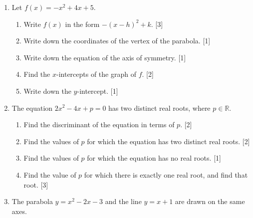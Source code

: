 \documentclass[12pt, twoside]{article}
\begin{document}
\begin{enumerate}[itemsep=0.2cm]
\newpage

\item Let $f(x) = -x^2 + 4x + 5$.

\begin{enumerate}[itemsep=0.15cm]
  \item Write $f(x)$ in the form $-(x - h)^2 + k$. \hfill [3]
  \item Write down the coordinates of the vertex of the parabola. \hfill [1]
  \item Write down the equation of the axis of symmetry. \hfill [1]
  \item Find the $x$-intercepts of the graph of $f$. \hfill [2]
  \item Write down the $y$-intercept. \hfill [1]
\end{enumerate}


\newpage

\item The equation $2x^2 - 4x + p = 0$ has two distinct real roots, where $p \in \mathbb{R}$.

\begin{enumerate}[itemsep=0.15cm]
  \item Find the discriminant of the equation in terms of $p$. \hfill [2]
  \item Find the values of $p$ for which the equation has two distinct real roots. \hfill [2]
  \item Find the values of $p$ for which the equation has no real roots. \hfill [1]
  \item Find the value of $p$ for which there is exactly one real root,
        and find that root. \hfill [3]
\end{enumerate}


\newpage

\item The parabola $y = x^2 - 2x - 3$ and the line $y = x + 1$ are drawn
on the same axes.


\end{enumerate}
\end{document}
